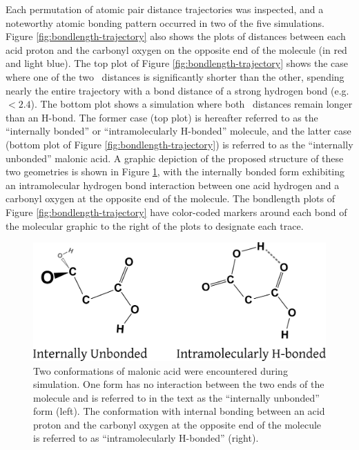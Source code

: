 Each permutation of atomic pair distance trajectories was inspected, and a noteworthy atomic bonding pattern occurred in two of the five simulations. Figure \ref{fig:bondlength-trajectory} also shows the plots of distances between each acid proton and the carbonyl oxygen on the opposite end of the molecule (in red and light blue). The top plot of Figure \ref{fig:bondlength-trajectory} shows the case where one of the two \ocarbh~distances is significantly shorter than the other, spending nearly the entire trajectory with a bond distance of a strong hydrogen bond (e.g. $< 2.4$\angs). The bottom plot shows a simulation where both \ocarbh~distances remain longer than an H-bond. The former case (top plot) is hereafter referred to as the ``internally bonded'' or ``intramolecularly H-bonded'' molecule, and the latter case (bottom plot of Figure \ref{fig:bondlength-trajectory}) is referred to as the ``internally unbonded'' malonic acid. A graphic depiction of the proposed structure of these two geometries is shown in Figure \ref{fig:structure}, with the internally bonded form exhibiting an intramolecular hydrogen bond interaction between one acid hydrogen and a carbonyl oxygen at the opposite end of the molecule. The bondlength plots of Figure \ref{fig:bondlength-trajectory} have color-coded markers around each bond of the molecular graphic to the right of the plots to designate each trace.

\begin{figure}[h!]
	\begin{center}
		\includegraphics[scale=1.0]{images/bond-length/structure.png}
		\caption{Two conformations of malonic acid were encountered during simulation. One form has no interaction between the two ends of the molecule and is referred to in the text as the ``internally unbonded'' form (left). The conformation with internal bonding between an acid proton and the carbonyl oxygen at the opposite end of the molecule is referred to as ``intramolecularly H-bonded'' (right).}
		\label{fig:structure}
	\end{center}
\end{figure}

